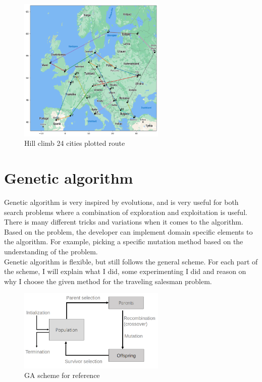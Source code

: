 \documentclass{article}
\begin{document}
    \begin{figure}[ht]
        \includegraphics[width=7cm]{images/hill_climb_24_cities.png}
        \centering
        \caption{Hill climb 24 cities plotted route}
    \end{figure}




    \section{Genetic algorithm}

    Genetic algorithm is very inspired by evolutions, and is very useful for both search problems where a combination of exploration and exploitation is useful.
    There is many different tricks and variations when it comes to the algorithm. Based on the problem, the developer can implement domain specific elements to the algorithm. For example, picking a specific mutation method based on the understanding of the problem. \\
    
    Genetic algorithm is flexible, but still follows the general scheme. For each part of the scheme, I will explain what I did, some experimenting I did and reason on why I choose the given method for the traveling salesman problem.

    \begin{figure}[ht]
        \includegraphics[width=7cm]{images/ga_scheme.png}
        \centering
        \caption{GA scheme for reference}
    \end{figure}
\end{document}
